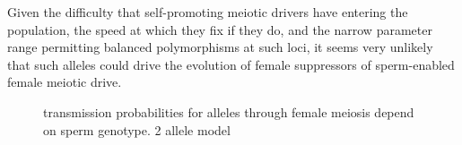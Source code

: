 \documentclass[12pt,letterpaper]{article}
\begin{document}
Given the difficulty that self-promoting meiotic drivers have entering the population, the speed at
which they fix if they do, and the narrow parameter range permitting balanced polymorphisms at such loci,  
it seems very unlikely that such alleles could drive the evolution of female suppressors of sperm-enabled
female meiotic drive.

\begin{figure}
\caption{transmission probabilities for alleles through female
  meiosis depend on sperm genotype. 2 allele model}  
\label{Eggsperm_2_allele_cartoon}
\end{figure}


\end{document}

